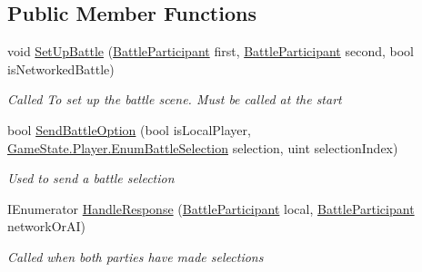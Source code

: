 \subsection*{Public Member Functions}
\begin{DoxyCompactItemize}
\item 
void \hyperlink{class_battle_handler_a380a371e96df1b362027a8f33c8ed7fb}{Set\-Up\-Battle} (\hyperlink{class_battle_participant}{Battle\-Participant} first, \hyperlink{class_battle_participant}{Battle\-Participant} second, bool is\-Networked\-Battle)
\begin{DoxyCompactList}\small\item\em Called To set up the battle scene. Must be called at the start \end{DoxyCompactList}\item 
bool \hyperlink{class_battle_handler_ad207e2adf6f1f3882e98b1c8a5f59f67}{Send\-Battle\-Option} (bool is\-Local\-Player, \hyperlink{class_game_state_1_1_player_a9f54c5eca1e60acbaa2074e981f51615}{Game\-State.\-Player.\-Enum\-Battle\-Selection} selection, uint selection\-Index)
\begin{DoxyCompactList}\small\item\em Used to send a battle selection \end{DoxyCompactList}\item 
I\-Enumerator \hyperlink{class_battle_handler_a25e3f172c7752e64dec1834f88055ad4}{Handle\-Response} (\hyperlink{class_battle_participant}{Battle\-Participant} local, \hyperlink{class_battle_participant}{Battle\-Participant} network\-Or\-A\-I)
\begin{DoxyCompactList}\small\item\em Called when both parties have made selections \end{DoxyCompactList}\end{DoxyCompactItemize}
